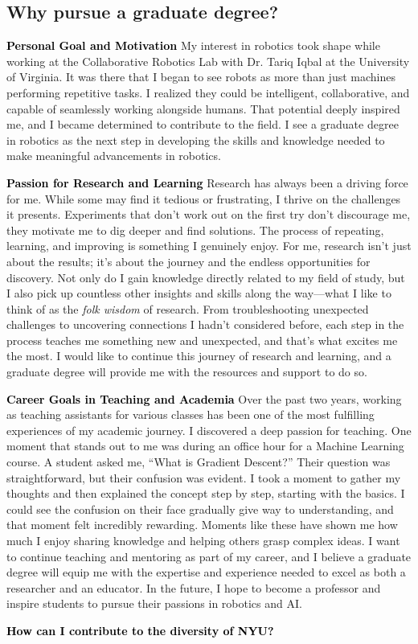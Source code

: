 \documentclass[10pt]{article}
\newcommand{\statement}[1]{\medskip\noindent
  \textcolor{black}{\textbf{#1}}\space
}
\begin{document}
\subsection*{Why pursue a graduate degree?}
\statement{Personal Goal and Motivation} My interest in robotics took shape while working at the Collaborative Robotics Lab with Dr. Tariq Iqbal at the University of Virginia. It was there that I began to see robots as more than just machines performing repetitive tasks. I realized they could be intelligent, collaborative, and capable of seamlessly working alongside humans. That potential deeply inspired me, and I became determined to contribute to the field. I see a graduate degree in robotics as the next step in developing the skills and knowledge needed to make meaningful advancements in robotics.

\statement{Passion for Research and Learning} Research has always been a driving force for me. While some may find it tedious or frustrating, I thrive on the challenges it presents. Experiments that don't work out on the first try don't discourage me, they motivate me to dig deeper and find solutions. The process of repeating, learning, and improving is something I genuinely enjoy. For me, research isn't just about the results; it's about the journey and the endless opportunities for discovery. Not only do I gain knowledge directly related to my field of study, but I also pick up countless other insights and skills along the way—what I like to think of as the \textit{folk wisdom} of research. From troubleshooting unexpected challenges to uncovering connections I hadn’t considered before, each step in the process teaches me something new and unexpected, and that's what excites me the most. I would like to continue this journey of research and learning, and a graduate degree will provide me with the resources and support to do so.

\statement{Career Goals in Teaching and Academia} Over the past two years, working as teaching assistants for various classes has been one of the most fulfilling experiences of my academic journey. I discovered a deep passion for teaching. One moment that stands out to me was during an office hour for a Machine Learning course. A student asked me, “What is Gradient Descent?” Their question was straightforward, but their confusion was evident. I took a moment to gather my thoughts and then explained the concept step by step, starting with the basics. I could see the confusion on their face gradually give way to understanding, and that moment felt incredibly rewarding. Moments like these have shown me how much I enjoy sharing knowledge and helping others grasp complex ideas. I want to continue teaching and mentoring as part of my career, and I believe a graduate degree will equip me with the expertise and experience needed to excel as both a researcher and an educator. In the future, I hope to become a professor and inspire students to pursue their passions in robotics and AI.

\statement{How can I contribute to the diversity of NYU?}
\end{document}

